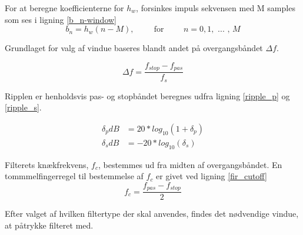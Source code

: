 For at beregne koefficienterne for $h_w$, forsinkes impuls sekvensen med M samples som ses i ligning \ref{b_n-window}
\begin{equation}
	b_n = h_w (n-M), \hspace{1cm} \text{for} \hspace{1cm} n = 0,1, \text{ ... , }M \label{b_n-window} 
\end{equation}

Grundlaget for valg af vindue baseres blandt andet på overgangsbåndet $\Delta f$.

\begin{equation}
\Delta f = \frac{f_{stop}-f_{pas}}{f_s} \label{Windows_transistionband}
\end{equation}

Ripplen er henholdsvis pas- og stopbåndet beregnes udfra ligning \ref{ripple_p} og \ref{ripple_s}.

\begin{align}
\delta_p dB &= 20*log_{10}(1+\delta_p) \label{ripple_p}\\
\delta_s dB &= -20*log_{10}(\delta_s) \label{ripple_s}
\end{align}

Filterets knækfrekvens, $f_c$, bestemmes ud fra midten af overgangsbåndet. En tommmelfingerregel til bestemmelse af $f_c$ er givet ved ligning \ref{fir_cutoff}
\begin{equation}
	f_c =\frac{f_{pas}-f_{stop}}{2} \label{fir_cutoff}
\end{equation}


Efter valget af hvilken filtertype der skal anvendes, findes det nødvendige vindue, at påtrykke filteret med.

